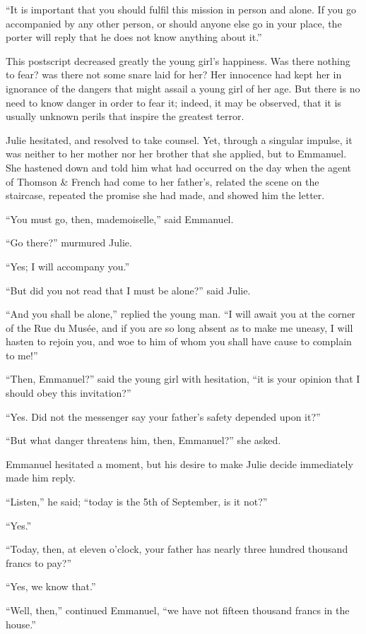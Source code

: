 “It is important that you should fulfil this mission in person and
alone. If you go accompanied by any other person, or should anyone else
go in your place, the porter will reply that he does not know anything
about it.”

This postscript decreased greatly the young girl’s happiness. Was there
nothing to fear? was there not some snare laid for her? Her innocence
had kept her in ignorance of the dangers that might assail a young girl
of her age. But there is no need to know danger in order to fear it;
indeed, it may be observed, that it is usually unknown perils that
inspire the greatest terror.

Julie hesitated, and resolved to take counsel. Yet, through a singular
impulse, it was neither to her mother nor her brother that she applied,
but to Emmanuel. She hastened down and told him what had occurred on
the day when the agent of Thomson \& French had come to her father’s,
related the scene on the staircase, repeated the promise she had made,
and showed him the letter.

“You must go, then, mademoiselle,” said Emmanuel.

“Go there?” murmured Julie.

“Yes; I will accompany you.”

“But did you not read that I must be alone?” said Julie.

“And you shall be alone,” replied the young man. “I will await you at
the corner of the Rue du Musée, and if you are so long absent as to
make me uneasy, I will hasten to rejoin you, and woe to him of whom you
shall have cause to complain to me!”

“Then, Emmanuel?” said the young girl with hesitation, “it is your
opinion that I should obey this invitation?”

“Yes. Did not the messenger say your father’s safety depended upon it?”

“But what danger threatens him, then, Emmanuel?” she asked.

Emmanuel hesitated a moment, but his desire to make Julie decide
immediately made him reply.

“Listen,” he said; “today is the 5th of September, is it not?”

“Yes.”

“Today, then, at eleven o’clock, your father has nearly three hundred
thousand francs to pay?”

“Yes, we know that.”

“Well, then,” continued Emmanuel, “we have not fifteen thousand francs
in the house.”

